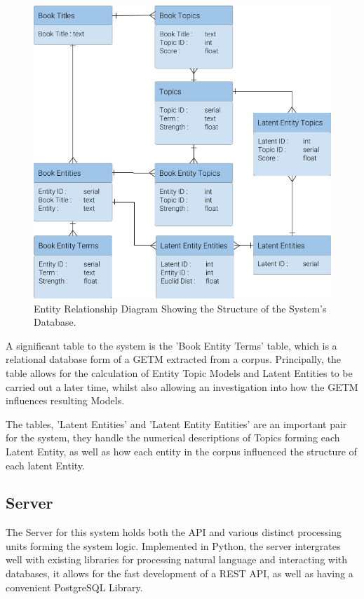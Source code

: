 \documentclass[10pt]{report}
\begin{document}
\begin{figure}[h!]
  \centering
  \includegraphics[scale=0.5]{db_erd}
  \caption{Entity Relationship Diagram Showing the Structure of the System's Database.\label{fig:db_erd}}
\end{figure}

A significant table to the system is the 'Book Entity Terms' table, which is a relational database form of a GETM extracted from a corpus. Principally, the table allows for the calculation of Entity Topic Models and Latent Entities to be carried out a later time, whilst also allowing an investigation into how the GETM influences resulting Models.

The tables, 'Latent Entities' and 'Latent Entity Entities' are an important pair for the system, they handle the numerical descriptions of Topics forming each Latent Entity, as well as how each entity in the corpus influenced the structure of each latent Entity.

\subsection{Server}
The Server for this system holds both the API and various distinct processing units forming the system logic. Implemented in Python, the server intergrates well with existing libraries for processing natural language and interacting with databases, it allows for the fast development of a REST API, as well as having a convenient PostgreSQL Library.
\end{document}
